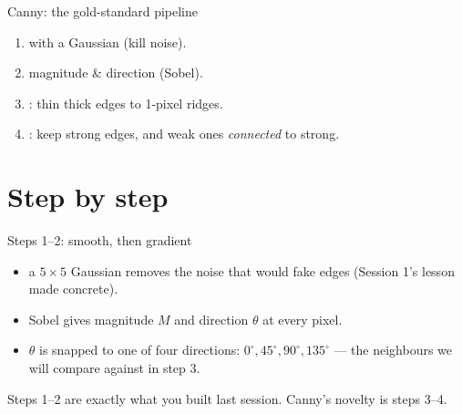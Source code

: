 \documentclass[10pt,aspectratio=169]{beamer}
\begin{document}
\begin{frame}{Canny: the gold-standard pipeline}
  \begin{center}
  \end{center}
  \begin{enumerate}
    \item {} with a Gaussian (kill noise).
    \item {} magnitude \& direction (Sobel).
    \item {}: thin thick edges to 1-pixel ridges.
    \item {}: keep strong edges, and weak ones \emph{connected} to strong.
  \end{enumerate}
\end{frame}

\section{Step by step}

\begin{frame}{Steps 1--2: smooth, then gradient}
  \begin{itemize}
    \item {} a $5{\times}5$ Gaussian removes the noise that would fake edges
          (Session 1's lesson made concrete).
    \item {} Sobel gives magnitude $M$ and direction $\theta$ at every pixel.
    \item $\theta$ is snapped to one of four directions: $0^\circ, 45^\circ, 90^\circ, 135^\circ$ —
          the neighbours we will compare against in step 3.
  \end{itemize}
  \begin{infobox}
    Steps 1--2 are exactly what you built last session. Canny's novelty is steps 3--4.
  \end{infobox}
\end{frame}
\end{document}
